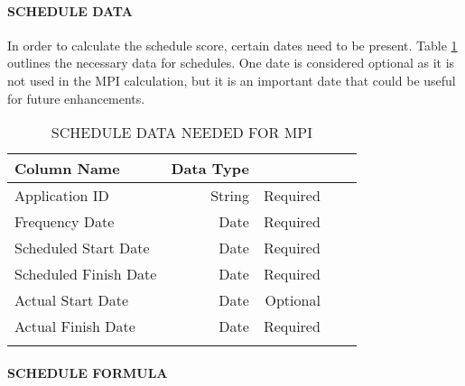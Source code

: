 \documentclass[SDSUThesis.tex]{subfiles}
\begin{document}
            \paragraph{SCHEDULE DATA}
            
                In order to calculate the schedule score, certain dates
                need to be present. Table \ref{tab:scheduledata} outlines
                the necessary data for schedules.  One date is considered
                optional as it is not used in the MPI calculation, but it
                is an important date that could be useful for future
                enhancements.
            
                \begin{longtable}{@{}l rr rr}
                    \toprule%
                     \centering%
                     {\bfseries Column Name}
                     & {\bfseries Data Type}
                     &  \\
                    
                    \cmidrule[0.4pt](r{0.125em}){1-1}%
                    \cmidrule[0.4pt](lr{0.125em}){2-2}%
                    \cmidrule[0.4pt](l{0.125em}){3-3}%
                    \endhead
                    
                    Application ID & String  & Required \\
                    \myrowcolour%
                    Frequency Date & Date & Required \\
                    Scheduled Start Date & Date & Required \\
                    \myrowcolour%
                    Scheduled Finish Date & Date & Required \\
                    Actual Start Date & Date  & Optional \\
                    \myrowcolour%
                    Actual Finish Date & Date  & Required \\
                    
                    \bottomrule
                    
                    \caption{SCHEDULE DATA NEEDED FOR MPI}
                    \label{tab:scheduledata}
                \end{longtable}
                    
            \paragraph{SCHEDULE FORMULA}
    
\end{document}
